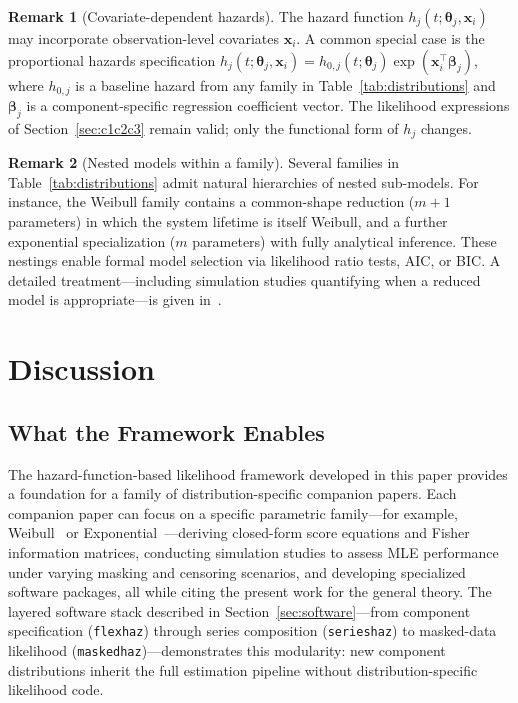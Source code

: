 \documentclass[11pt]{article}
\theoremstyle{definition}
\newtheorem{remark}{Remark}
\theoremstyle{plain}
\renewcommand{\v}[1]{\boldsymbol{#1}}
\begin{document}
\begin{remark}[Covariate-dependent hazards]
\label{rem:covariate-hazards}
The hazard function $h_j(t; \v{\theta}_j, \v{x}_i)$ may incorporate
observation-level covariates $\v{x}_i$. A common special case is the
proportional hazards specification
$h_j(t; \v{\theta}_j, \v{x}_i) = h_{0,j}(t; \v{\theta}_j)
\exp(\v{x}_i^\top \v{\beta}_j)$,
where $h_{0,j}$ is a baseline hazard from any family in
Table~\ref{tab:distributions} and $\v{\beta}_j$ is a
component-specific regression coefficient vector.
The likelihood expressions of Section~\ref{sec:c1c2c3} remain valid;
only the functional form of $h_j$ changes.
\end{remark}

\begin{remark}[Nested models within a family]
\label{rem:nested-models}
Several families in Table~\ref{tab:distributions} admit natural
hierarchies of nested sub-models.
For instance, the Weibull family contains a common-shape reduction
($m + 1$ parameters) in which the system lifetime is itself Weibull,
and a further exponential specialization ($m$ parameters) with fully
analytical inference.
These nestings enable formal model selection via likelihood ratio
tests, AIC, or BIC.
A detailed treatment---including simulation studies quantifying when
a reduced model is appropriate---is given
in~\citet{towell2025model-selection}.
\end{remark}


\section{Discussion}
\label{sec:discussion}

\subsection{What the Framework Enables}
\label{sec:what-enables}

The hazard-function-based likelihood framework developed in this paper
provides a foundation for a family of distribution-specific companion
papers.
Each companion paper can focus on a specific parametric family---for
example, Weibull~\citep{towell2025weibull-series} or
Exponential~\citep{towell2025exponential-series}---deriving
closed-form score equations and Fisher information matrices, conducting
simulation studies to assess MLE performance under varying masking and
censoring scenarios, and developing specialized software packages, all
while citing the present work for the general theory.
The layered software stack described in
Section~\ref{sec:software}---from component specification
(\texttt{flexhaz}) through series composition
(\texttt{serieshaz}) to masked-data likelihood
(\texttt{maskedhaz})---demonstrates this modularity:
new component distributions inherit the full estimation pipeline
without distribution-specific likelihood code.
\end{document}
